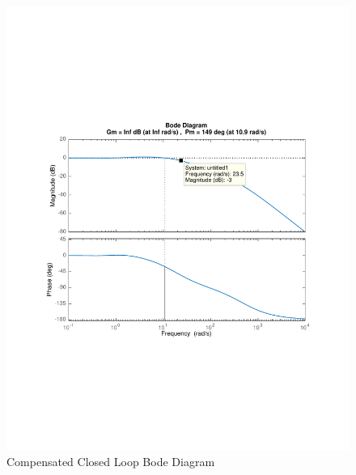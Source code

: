 \documentclass[12pt]{article}
\begin{document}
\begin{figure}[h]
\begin{center}
\includegraphics[width=1\textwidth]{figures/compensated_close_loop_bode}
\caption{Compensated Closed Loop Bode Diagram}
\end{center}
\end{figure}
\end{document}
